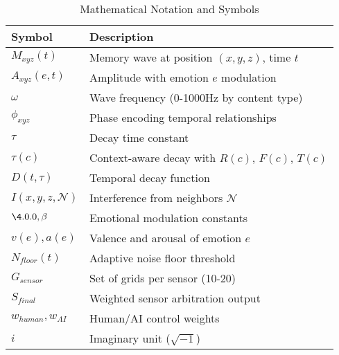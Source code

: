 \documentclass[11pt,letterpaper]{article}
\begin{document}
\begin{table}[h]
\centering
\caption{Mathematical Notation and Symbols}
\label{tab:symbols}
\footnotesize
\begin{tabular}{@{}ll@{}}
\toprule
\textbf{Symbol} & \textbf{Description} \\
\midrule
$M_{xyz}(t)$ & Memory wave at position $(x,y,z)$, time $t$ \\
$A_{xyz}(e,t)$ & Amplitude with emotion $e$ modulation \\
$\omega$ & Wave frequency (0-1000Hz by content type) \\
$\phi_{xyz}$ & Phase encoding temporal relationships \\
$\tau$ & Decay time constant \\
$\tau(c)$ & Context-aware decay with $R(c)$, $F(c)$, $T(c)$ \\
$D(t,\tau)$ & Temporal decay function \\
$I(x,y,z,\mathcal{N})$ & Interference from neighbors $\mathcal{N}$ \\
$\4.0.0, \beta$ & Emotional modulation constants \\
$v(e), a(e)$ & Valence and arousal of emotion $e$ \\
$N_{floor}(t)$ & Adaptive noise floor threshold \\
$G_{sensor}$ & Set of grids per sensor (10-20) \\
$S_{final}$ & Weighted sensor arbitration output \\
$w_{human}, w_{AI}$ & Human/AI control weights \\
$i$ & Imaginary unit ($\sqrt{-1}$) \\
\bottomrule
\end{tabular}
\end{table}
\end{document}
